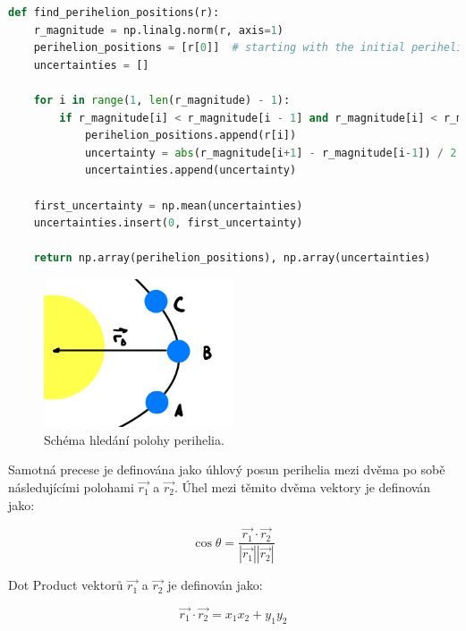 \documentclass[a4paper,11pt,twocolumn]{article}
\begin{document}
\begin{lstlisting}[language=Python, caption={Výpočet poloh perihelia}]
def find_perihelion_positions(r):
    r_magnitude = np.linalg.norm(r, axis=1)
    perihelion_positions = [r[0]]  # starting with the initial perihelion
    uncertainties = []
    
    for i in range(1, len(r_magnitude) - 1):
        if r_magnitude[i] < r_magnitude[i - 1] and r_magnitude[i] < r_magnitude[i + 1]:
            perihelion_positions.append(r[i])
            uncertainty = abs(r_magnitude[i+1] - r_magnitude[i-1]) / 2  # approximation of positional uncertainty
            uncertainties.append(uncertainty)

    first_uncertainty = np.mean(uncertainties)
    uncertainties.insert(0, first_uncertainty)
    
    return np.array(perihelion_positions), np.array(uncertainties)
\end{lstlisting}

            \begin{figure}
                \centering
                \includegraphics[width=0.5\textwidth]{per_pos_scheme.png}
                \caption{Schéma hledání polohy perihelia.}
                \label{fig:per_scheme}
            \end{figure}

            Samotná precese je definována jako úhlový posun perihelia mezi dvěma po sobě následujícími polohami $\vec{r_1}$ a $\vec{r_2}$. Úhel mezi těmito dvěma vektory je definován jako: 

            \begin{equation}
                \cos{\theta} = \frac{\vec{r_1} \cdot \vec{r_2}}{|\vec{r_1}||\vec{r_2}|}
                \label{eq:cos}
            \end{equation}

            Dot Product vektorů $\vec{r_1}$ a $\vec{r_2}$ je definován jako:

            \begin{equation}
                \vec{r_1} \cdot \vec{r_2} = x_1 x_2 + y_1 y_2
                \label{eq:dot}
            \end{equation}
\end{document}
